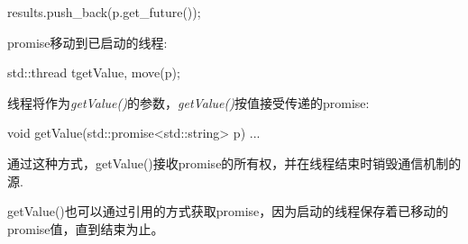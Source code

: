 \begin{cppcode}
results.push_back(p.get_future());
\end{cppcode}

promise移动到已启动的线程:

\begin{cppcode}
std::thread t{getValue, move(p)};
\end{cppcode}

线程将作为\textit{getValue()}的参数，\textit{getValue()}按值接受传递的promise:

\begin{cppcode}
void getValue(std::promise<std::string> p)
{
	...
}
\end{cppcode}

通过这种方式，getValue()接收promise的所有权，并在线程结束时销毁通信机制的源.

getValue()也可以通过引用的方式获取promise，因为启动的线程保存着已移动的promise值，直到结束为止。














